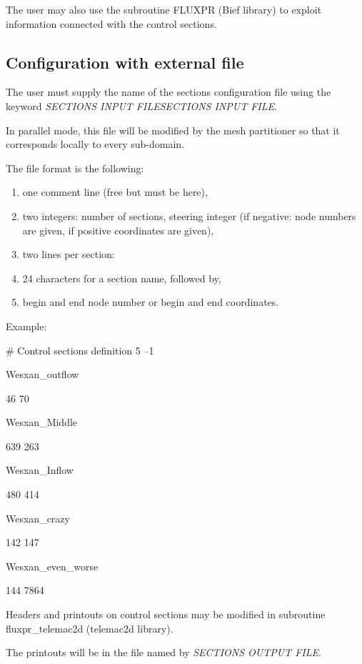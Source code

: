  The user may also use the subroutine FLUXPR (Bief library) to exploit information connected with the control sections.


\subsection{ Configuration with external file}

 The user must supply the name of the sections configuration file using the keyword \textit{SECTIONS INPUT FILESECTIONS INPUT FILE}.

 In parallel mode, this file will be modified by the mesh partitioner so that it corresponds locally to every sub-domain.

 The file format is the following:

\begin{enumerate}
\item  one comment line (free but must be here),

\item  two integers: number of sections, steering integer (if negative: node numbers are given, if positive coordinates are given),

\item  two lines per section:

\item  24 characters for a section name, followed by,

\item  begin and end node number or begin and end coordinates.
\end{enumerate}

 Example:

 \# Control sections definition 5 --1

 Wesxan\_outflow

 46 70

 Wesxan\_Middle

 639 263

 Wesxan\_Inflow

 480 414

 Wesxan\_crazy

 142 147

 Wesxan\_even\_worse

 144 7864

 Headers and printouts on control sections may be modified in subroutine fluxpr\_telemac2d (telemac2d library).

 The printouts will be in the file named by \textit{SECTIONS OUTPUT FILE}.


